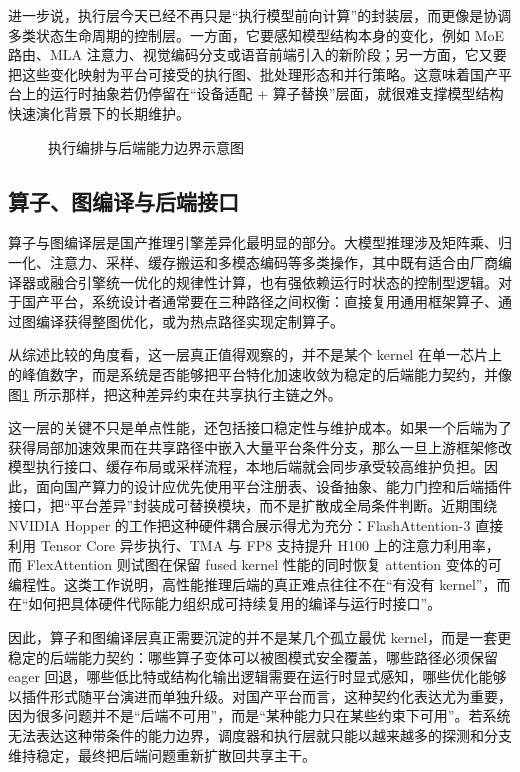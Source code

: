 进一步说，执行层今天已经不再只是“执行模型前向计算”的封装层，而更像是协调多类状态生命周期的控制层。一方面，它要感知模型结构本身的变化，例如 MoE 路由、MLA 注意力、视觉编码分支或语音前端引入的新阶段；另一方面，它又要把这些变化映射为平台可接受的执行图、批处理形态和并行策略\citep{liu2024deepseekv2,deepseekv3,wang2024qwen2vl,chen2024internvl2,zeng2024glm4voice}。这意味着国产平台上的运行时抽象若仍停留在“设备适配 + 算子替换”层面，就很难支撑模型结构快速演化背景下的长期维护。

\begin{figure}[t]
\centering
\resizebox{0.9\linewidth}{!}{}
\caption{执行编排与后端能力边界示意图}
\label{fig:execution-backend-boundary}
\end{figure}

\subsection{算子、图编译与后端接口}

算子与图编译层是国产推理引擎差异化最明显的部分。大模型推理涉及矩阵乘、归一化、注意力、采样、缓存搬运和多模态编码等多类操作，其中既有适合由厂商编译器或融合引擎统一优化的规律性计算，也有强依赖运行时状态的控制型逻辑。对于国产平台，系统设计者通常要在三种路径之间权衡：直接复用通用框架算子、通过图编译获得整图优化，或为热点路径实现定制算子。

从综述比较的角度看，这一层真正值得观察的，并不是某个 kernel 在单一芯片上的峰值数字，而是系统是否能够把平台特化加速收敛为稳定的后端能力契约，并像图\ref{fig:execution-backend-boundary} 所示那样，把这种差异约束在共享执行主链之外。

这一层的关键不只是单点性能，还包括接口稳定性与维护成本。如果一个后端为了获得局部加速效果而在共享路径中嵌入大量平台条件分支，那么一旦上游框架修改模型执行接口、缓存布局或采样流程，本地后端就会同步承受较高维护负担。因此，面向国产算力的设计应优先使用平台注册表、设备抽象、能力门控和后端插件接口，把“平台差异”封装成可替换模块，而不是扩散成全局条件判断。近期围绕 NVIDIA Hopper 的工作把这种硬件耦合展示得尤为充分：FlashAttention-3 直接利用 Tensor Core 异步执行、TMA 与 FP8 支持提升 H100 上的注意力利用率，而 FlexAttention 则试图在保留 fused kernel 性能的同时恢复 attention 变体的可编程性\citep{shah2024flashattention3,dong2025flexattention}。这类工作说明，高性能推理后端的真正难点往往不在“有没有 kernel”，而在“如何把具体硬件代际能力组织成可持续复用的编译与运行时接口”。

因此，算子和图编译层真正需要沉淀的并不是某几个孤立最优 kernel，而是一套更稳定的后端能力契约：哪些算子变体可以被图模式安全覆盖，哪些路径必须保留 eager 回退，哪些低比特或结构化输出逻辑需要在运行时显式感知，哪些优化能够以插件形式随平台演进而单独升级。对国产平台而言，这种契约化表达尤为重要，因为很多问题并不是“后端不可用”，而是“某种能力只在某些约束下可用”。若系统无法表达这种带条件的能力边界，调度器和执行层就只能以越来越多的探测和分支维持稳定，最终把后端问题重新扩散回共享主干。

